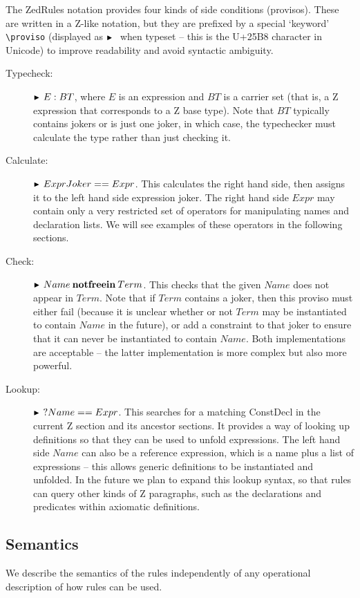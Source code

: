 \documentclass{entcs}
\begin{document}
The ZedRules notation provides four kinds of side conditions (provisos).
These are written in a Z-like notation, but they are prefixed by
a special `keyword' \verb!\proviso! (displayed as $\proviso$ when
typeset -- this is the U+25B8 character in Unicode) to improve
readability and avoid syntactic ambiguity. 
\begin{description}
\item[Typecheck:] $\proviso E:BT$, where $E$ is an expression and $BT$
  is a carrier set (that is, a Z expression that corresponds to a Z
  base type).  Note that $BT$ 
  typically contains jokers or is just one joker, in which case, the
  typechecker must calculate the type rather than just checking it.
\item[Calculate:] $\proviso ExprJoker == Expr$.
  This calculates the right hand side, then assigns it to the left hand
  side expression joker.
  The right hand side $Expr$ may contain only a very restricted set of
  operators for manipulating names and declaration lists.  We will see
  examples of these operators in the following sections.
\item[Check:] $\proviso Name \notfreein Term$.
  This checks that the given $Name$ does not appear in $Term$.
  Note that if $Term$ contains a joker, then this proviso must either
  fail (because it is unclear whether or not $Term$ may be
  instantiated to contain $Name$ in the future), or add a
  constraint to that joker to ensure that it can never be instantiated to
  contain $Name$.  Both implementations are acceptable -- the latter
  implementation is more complex but also more powerful.
\item[Lookup:] $\proviso? Name==Expr$.
  This searches for a matching ConstDecl in the current Z section
  and its ancestor sections.  It provides a way of looking up 
  definitions so that they can be used to unfold expressions.
  The left hand side $Name$ can also be a reference expression,
  which is a name plus a list of expressions -- this allows generic
  definitions to be instantiated and unfolded.  In the future we plan
  to expand this lookup syntax, so that rules can query other kinds of
  Z paragraphs, such as the declarations and predicates within 
  axiomatic definitions.
\end{description}

\subsection{Semantics}

We describe the semantics of the rules independently of any operational
description of how rules can be used. 
\end{document}
